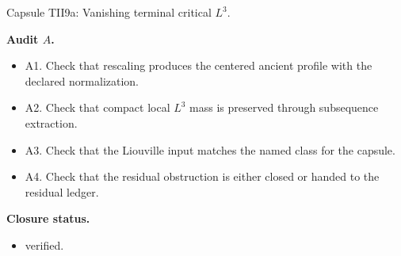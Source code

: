 \documentclass[11pt]{amsart}
\newcommand{\capsulefield}[1]{\par\smallskip\noindent\textbf{#1.}\ }
\begin{document}
\begin{proofcapsule}{Capsule TII9a: Vanishing terminal critical $L^3$.}
  \capsulefield{Audit \(A\)}
  \begin{itemize}[leftmargin=1.8em]
  \item A1. Check that rescaling produces the centered ancient profile with the declared normalization.
  \item A2. Check that compact local $L^3$ mass is preserved through subsequence extraction.
  \item A3. Check that the Liouville input matches the named class for the capsule.
  \item A4. Check that the residual obstruction is either closed or handed to the residual ledger.
  \end{itemize}
  \capsulefield{Closure status}
  \begin{itemize}[leftmargin=1.8em]
  \item verified.
  \end{itemize}
\end{proofcapsule}
\end{document}
